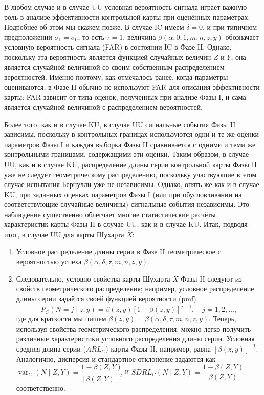 В любом случае и в случае UU условная вероятность сигнала играет важную роль в анализе эффективности контрольной карты при оценённых параметрах. Подробнее об этом мы скажем позже. В случае IC имеем \(\delta = 0\), и при типичном предположении \(\sigma_1 = \sigma_0\), то есть \(\tau = 1\), величина \(\beta(\alpha, 0, 1, m, n, z, y)\) обозначает условную вероятность сигнала (FAR) в состоянии IC в Фазе II. Однако, поскольку эта вероятность является функцией случайных величин \(Z\) и \(Y\), она является случайной величиной со своим собственным распределением вероятностей. Именно поэтому, как отмечалось ранее, когда параметры оцениваются, в Фазе II обычно не используют FAR для описания эффективности карты: FAR зависит от типа оценок, полученных при анализе Фазы I, и сама является случайной величиной с распределением вероятностей.

Более того, как и в случае KU, в случае UU сигнальные события Фазы II зависимы, поскольку в контрольных границах используются одни и те же оценки параметров Фазы I и каждая выборка Фазы II сравнивается с одними и теми же контрольными границами, содержащими эти оценки. Таким образом, в случае UU, как и в случае KU, распределение длины серии контрольной карты Фазы II уже не следует геометрическому распределению, поскольку участвующие в этом случае испытания Бернулли уже не независимы. Однако, опять же как и в случае KU, при заданных оценках параметров Фазы I (или при обусловливании на соответствующие случайные величины) сигнальные события независимы. Это наблюдение существенно облегчает многие статистические расчёты характеристик карты Фазы II в случае UU, как и в случае KU. Итак, подводя итог, в случае UU для карты Шухарта \(\overline{X}\):

\begin{enumerate}
	\item Условное распределение длины серии в Фазе II геометрическое с вероятностью успеха \(\beta(\alpha, \delta, \tau, m, n, z, y)\).
	\item Следовательно, условно свойства карты Шухарта \(\overline{X}\) Фазы II следуют из свойств геометрического распределения; например, условное распределение длины серии задаётся своей функцией вероятности (pmf)
	\[
		P_C(N = j \mid z, y) = \beta(z, y)[1 - \beta(z, y)]^{j-1}, \quad j = 1, 2, \ldots,
	\]
	где для краткости мы пишем \(\beta(z, y) = \beta(\alpha, \delta, \tau, m, n, z, y)\). Теперь, используя свойства геометрического распределения, можно легко получить различные характеристики условного распределения длины серии. Условная средняя длина серии (\(ARL_C\)) карты Фазы II, например, равна \([\beta(z, y)]^{-1}\). Аналогично, дисперсия и стандартное отклонение задаются как \(\operatorname{var}_C(N \mid Z, Y) = \dfrac{1 - \beta(Z, Y)}{[\beta(Z, Y)]^2}\) и \(SDRL_C(N \mid Z, Y) = \dfrac{1 - \beta(Z, Y)}{\beta(Z, Y)}\) соответственно.
\end{enumerate}

